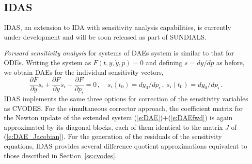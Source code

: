 
\subsection{IDAS}\label{ss:idas}

IDAS, an extension to IDA with sensitivity analysis capabilities, is 
currently under development and will be soon released as part of SUNDIALS.

{\em Forward sensitivity analysis} for systems of DAEs system is similar to that 
for ODEs.  Writing the system as $F(t,y,\dot{y},p)=0$ and defining 
$s={dy}/{dp}$ as before, we obtain DAEs for the individual sensitivity vectors,
%
\begin{equation}\label{e:DAEfwd}
  \frac{\partial F}{\partial y} s_i + \frac{\partial F}{\partial \dot{y}} \dot{s}_i
  + \frac{\partial F}{\partial p_i}  = 0 \, , \quad
  s_i(t_0) = dy_0 / dp_i \, , ~ \dot{s}_i(t_0) = d\dot{y}_0 / dp_i \, .
\end{equation}
%
IDAS implements the same three options for correction of the sensitivity
variables as CVODES. For the simultaneous corrector approach, the coefficient
matrix for the Newton update of the extended system (\ref{e:DAE})+(\ref{e:DAEfwd})
is again approximated by its diagonal blocks, each of them identical to the
matrix $J$ of (\ref{e:DAE_Jacobian}). For the generation of the residuals of the sensitivity
equations, IDAS provides several difference quotient approximations equivalent 
to those described in Section~\ref{ss:cvodes}.

